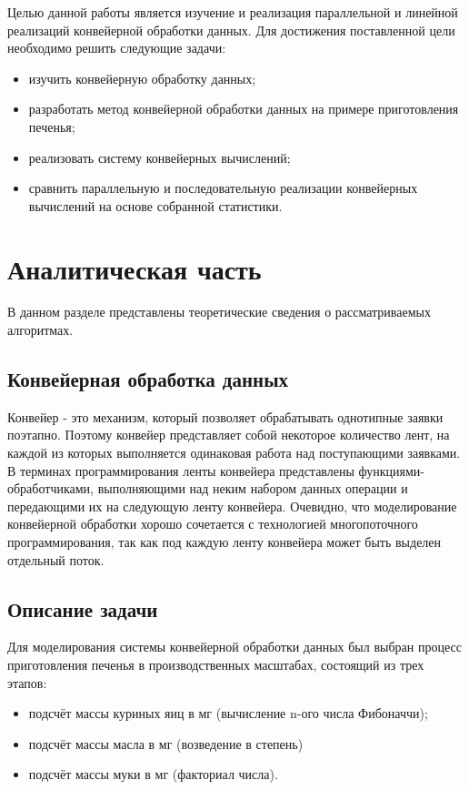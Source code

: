 \documentclass[12pt]{report}
\begin{document}
Целью данной работы является  изучение и реализация параллельной и линейной реализаций конвейерной обработки данных. Для достижения поставленной цели необходимо решить следующие задачи:
\begin{itemize}
    \item изучить конвейерную обработку данных;
    \item разработать метод конвейерной обработки данных на примере приготовления печенья;
	\item реализовать систему конвейерных вычислений;
	\item сравнить параллельную и последовательную реализации конвейерных вычислений на основе собранной статистики.
\end{itemize}

\chapter{Аналитическая часть}

В данном разделе представлены теоретические сведения о рассматриваемых алгоритмах.

\section{Конвейерная обработка данных}

Конвейер - это механизм, который позволяет обрабатывать однотипные заявки поэтапно. Поэтому конвейер представляет собой некоторое количество лент, на каждой из которых выполняется одинаковая работа над поступающими заявками. В терминах программирования ленты конвейера представлены функциями-обработчиками, выполняющими над неким набором данных операции и передающими их на следующую ленту конвейера. Очевидно, что моделирование конвейерной обработки хорошо сочетается с технологией многопоточного программирования, так как под каждую ленту конвейера может быть выделен отдельный поток. 

\section{Описание задачи}

Для моделирования системы конвейерной обработки данных был выбран процесс приготовления печенья в производственных масштабах, состоящий из трех этапов:

\begin{itemize}
	\item подсчёт массы куриных яиц в мг (вычисление n-ого числа Фибоначчи);
	\item подсчёт массы масла в мг (возведение в степень)
	\item подсчёт массы муки в мг (факториал числа).
\end{itemize}
\end{document}
